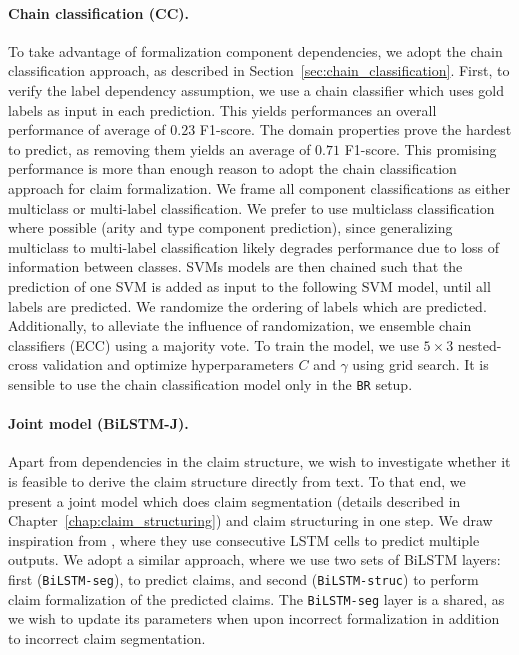 \paragraph{Chain classification (CC). }
To take advantage of formalization component dependencies, we adopt the chain
classification approach, as described in
Section~\ref{sec:chain_classification}.
First, to verify the label dependency assumption, we use a chain classifier
which uses gold  labels as input in each prediction.  
This yields performances an overall performance of average of $0.23$ F1-score. 
The domain properties prove the hardest to predict, as removing them yields
an average of $0.71$ F1-score. 
This promising performance is more than enough reason to adopt the
chain classification approach for claim formalization. 
We frame all component classifications as either multiclass or multi-label classification.
We prefer to use multiclass classification where possible 
(arity and type component prediction), since
generalizing multiclass to multi-label classification likely degrades performance
due to loss of information between classes. 
SVMs models are then chained such that the prediction of one SVM is added as
input to the following SVM model, until all labels are predicted. 
We randomize the ordering of labels which are predicted.
Additionally, to alleviate the influence of randomization, we 
ensemble chain classifiers (ECC) using a majority vote. 
To train the model, we use $5 \times 3$ nested-cross validation
and optimize hyperparameters $C$ and $\gamma$ using grid search. 
It is sensible to use the chain classification model only in the
\texttt{BR} setup.

\paragraph{Joint model (BiLSTM-J). } 
Apart from dependencies in the claim structure, we wish to investigate whether
it is feasible to derive the claim structure directly from text. 
To that end, we present a joint model which does claim segmentation (details described in
Chapter~\ref{chap:claim_structuring}) and claim structuring in one step. We
draw inspiration from \citep{miwa2016end}, where they use consecutive
LSTM cells to predict multiple outputs. We adopt a similar approach, where we
use two sets of BiLSTM layers: first (\texttt{BiLSTM-seg}), to predict claims, and
second (\texttt{BiLSTM-struc}) to perform claim formalization of the predicted claims. The
\texttt{BiLSTM-seg} layer is a shared, as we wish to update its parameters
when upon incorrect formalization in addition to incorrect claim segmentation.

